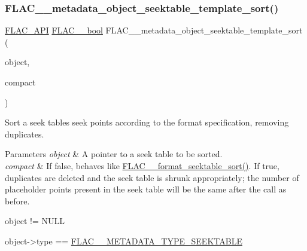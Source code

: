 \subsubsection{\texorpdfstring{F\+L\+A\+C\+\_\+\+\_\+metadata\+\_\+object\+\_\+seektable\+\_\+template\+\_\+sort()}{FLAC\_\_metadata\_object\_seektable\_template\_sort()}}
{\footnotesize\ttfamily \hyperlink{group__flac__export_ga56ca07df8a23310707732b1c0007d6f5}{F\+L\+A\+C\+\_\+\+A\+PI} \hyperlink{ordinals_8h_a95103469f1cbd78b8cf250194985b34e}{F\+L\+A\+C\+\_\+\+\_\+bool} F\+L\+A\+C\+\_\+\+\_\+metadata\+\_\+object\+\_\+seektable\+\_\+template\+\_\+sort (\begin{DoxyParamCaption}\item[{\hyperlink{struct_f_l_a_c_____stream_metadata}{F\+L\+A\+C\+\_\+\+\_\+\+Stream\+Metadata} $\ast$}]{object,  }\item[{\hyperlink{ordinals_8h_a95103469f1cbd78b8cf250194985b34e}{F\+L\+A\+C\+\_\+\+\_\+bool}}]{compact }\end{DoxyParamCaption})}

Sort a seek table\textquotesingle{}s seek points according to the format specification, removing duplicates.


\begin{DoxyParams}{Parameters}
{\em object} & A pointer to a seek table to be sorted. \\
\hline
{\em compact} & If {\ttfamily false}, behaves like \hyperlink{group__flac__format_gad1b0090d45a6d65a696a81261bd7fbf6}{F\+L\+A\+C\+\_\+\+\_\+format\+\_\+seektable\+\_\+sort()}. If {\ttfamily true}, duplicates are deleted and the seek table is shrunk appropriately; the number of placeholder points present in the seek table will be the same after the call as before.  
\begin{DoxyCode}
\textcolor{keywordtype}{object} != NULL 
\end{DoxyCode}
 
\begin{DoxyCode}
\textcolor{keywordtype}{object}->type == \hyperlink{group__flac__format_ggac71714ba8ddbbd66d26bb78a427fac01a5f6323e489be1318f0e3747960ebdd91}{FLAC\_\_METADATA\_TYPE\_SEEKTABLE} 
\end{DoxyCode}
 \\
\hline
\end{DoxyParams}

